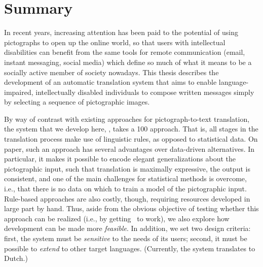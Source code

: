 \chapter*{Summary}

In recent years, increasing attention has been paid to the potential of using
pictographs to open up the online world, so that users with intellectual
disabilities can benefit from the same tools for remote communication (email,
instant messaging, social media) which define so much of what it means to be a
socially active member of society nowadays. This thesis describes the
development of an automatic translation system that aims to enable
language-impaired, intellectually disabled individuals to compose written
messages simply by selecting a sequence of pictographic images.

By way of contrast with existing approaches for pictograph-to-text translation,
the system that we develop here, \depicto, takes a 100%
approach. That is, all stages in the translation process make use of linguistic
rules, as opposed to statistical data. On paper, such an approach has several
advantages over data-driven alternatives. In particular, it makes it possible
to encode elegant generalizations about the pictographic input, such that
translation is maximally expressive, the output is consistent, and one of the
main challenges for statistical methods is overcome, i.e., that there is no
data on which to train a model of the pictographic input. Rule-based approaches
are also costly, though, requiring resources developed in large part by hand.
Thus, aside from the obvious objective of testing whether this approach can be
realized (i.e., by getting \depicto\ to work), we also explore how development
can be made more \emph{feasible}. In addition, we set two design criteria:
first, the system must be \emph{sensitive} to the needs of its users; second,
it must be possible to \emph{extend} to other target languages. (Currently, the
system translates to Dutch.)

